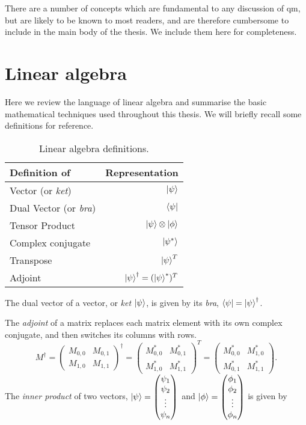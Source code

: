 There are a number of concepts which are fundamental to any discussion of \gls{qm}, 
    but are likely to be known to most readers, and are therefore cumbersome to include in the main body of the thesis. 
We include them here for completeness\footnotemark. 

\section{Linear algebra}\label{sec:linear_algebra}
Here we review the language of linear algebra and summarise the basic mathematical techniques used throughout this thesis.
We will briefly recall some definitions for reference. 

\begin{table}[h]
    \centering
    \begin{tabular}{lr}
        \hline 
        Definition of & Representation \\
        \hline 
        Vector (or \textit{ket})     & $\ket{\psi} $  \\
        Dual Vector (or \textit{bra}) & $\bra{\psi}  $ \\
        Tensor Product & $\ket{\psi} \otimes \ket{\phi}$ \\
        Complex conjugate & $\ket{\psi^{*}}$ \\
        Transpose & $\ket{\psi}^T $\\
        Adjoint & $\ket{\psi}^{\dag}  = (\ket{\psi}^{*})^{T}$\\
        \hline 
    \end{tabular}
    \caption[Linear algebra defintions]{Linear algebra definitions.}
    \label{table:linear_algebra}
\end{table}
The dual vector of a vector, or \emph{ket} $\ket{\psi}$, is given by its \emph{bra},  $\bra{\psi} = \ket{\psi}^{\dag}$. 

The \textit{adjoint} of a matrix replaces each matrix element with its own complex conjugate, and then switches its columns with rows.
    \begin{equation}
    M^{\dag} = \begin{pmatrix}
    M_{0,0} & M_{0,1} \\ M_{1,0} & M_{1,1} \end{pmatrix}  ^{\dag} = 
    \begin{pmatrix}
    M_{0,0}^* & M_{0,1}^* \\ M_{1,0}^* & M_{1,1}^* \end{pmatrix} ^T = 
    \begin{pmatrix}
    M_{0,0}^* & M_{1,0}^* \\ M_{0,1}^* & M_{1,1}^* \end{pmatrix}.
    \end{equation}
The \textit{inner product} of two vectors, $\ket{\psi} = \left(\begin{matrix}\psi_1 \\ \psi_2 \\ \vdots \\ \psi_n\end{matrix}\right)$ and $\ket{\phi}= \left(\begin{matrix}\phi_1 \\ \phi_2 \\ \vdots \\ \phi_n \end{matrix}\right)$ is given by 

